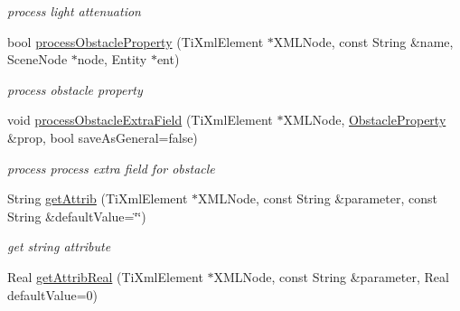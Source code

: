 \begin{DoxyCompactItemize}
\begin{DoxyCompactList}\small\item\em process light attenuation \end{DoxyCompactList}\item 
bool \hyperlink{class_ogre_1_1_dot_scene_loader_a31771f6a68683919b853c29a2acb8689}{process\+Obstacle\+Property} (Ti\+Xml\+Element $\ast$X\+M\+L\+Node, const String \&name, Scene\+Node $\ast$node, Entity $\ast$ent)\hypertarget{class_ogre_1_1_dot_scene_loader_a31771f6a68683919b853c29a2acb8689}{}\label{class_ogre_1_1_dot_scene_loader_a31771f6a68683919b853c29a2acb8689}

\begin{DoxyCompactList}\small\item\em process obstacle property \end{DoxyCompactList}\item 
void \hyperlink{class_ogre_1_1_dot_scene_loader_aa8c6a5f51bebc6b703cfbdfaaa6277c7}{process\+Obstacle\+Extra\+Field} (Ti\+Xml\+Element $\ast$X\+M\+L\+Node, \hyperlink{class_ogre_1_1_obstacle_property}{Obstacle\+Property} \&prop, bool save\+As\+General=false)\hypertarget{class_ogre_1_1_dot_scene_loader_aa8c6a5f51bebc6b703cfbdfaaa6277c7}{}\label{class_ogre_1_1_dot_scene_loader_aa8c6a5f51bebc6b703cfbdfaaa6277c7}

\begin{DoxyCompactList}\small\item\em process process extra field for obstacle \end{DoxyCompactList}\item 
String \hyperlink{class_ogre_1_1_dot_scene_loader_a41335e4e39ec4a62ebd3f58a525337bf}{get\+Attrib} (Ti\+Xml\+Element $\ast$X\+M\+L\+Node, const String \&parameter, const String \&default\+Value=\char`\"{}\char`\"{})\hypertarget{class_ogre_1_1_dot_scene_loader_a41335e4e39ec4a62ebd3f58a525337bf}{}\label{class_ogre_1_1_dot_scene_loader_a41335e4e39ec4a62ebd3f58a525337bf}

\begin{DoxyCompactList}\small\item\em get string attribute \end{DoxyCompactList}\item 
Real \hyperlink{class_ogre_1_1_dot_scene_loader_ad5c825b778226c0b28576aae196fea5f}{get\+Attrib\+Real} (Ti\+Xml\+Element $\ast$X\+M\+L\+Node, const String \&parameter, Real default\+Value=0)\hypertarget{class_ogre_1_1_dot_scene_loader_ad5c825b778226c0b28576aae196fea5f}{}\label{class_ogre_1_1_dot_scene_loader_ad5c825b778226c0b28576aae196fea5f}


\end{DoxyCompactItemize}
